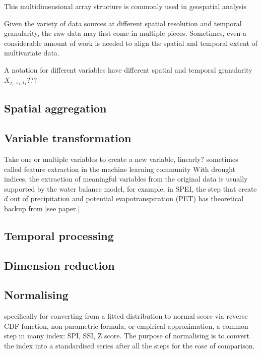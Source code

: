 \documentclass[
]{article}
\begin{document}
This multidimensional array structure is commonly used in geospatial
analysis

Given the variety of data sources at different spatial resolution and
temporal granularity, the raw data may first come in multiple pieces.
Sometimes, even a considerable amount of work is needed to align the
spatial and temporal extent of multivariate data.

A notation for different variables have different spatial and temporal
granularity \(X_{j_1, s_1, t_1}\)???

\hypertarget{spatial-aggregation}{%
\subsection{Spatial aggregation}\label{spatial-aggregation}}

\hypertarget{variable-transformation}{%
\subsection{Variable transformation}\label{variable-transformation}}

Take one or multiple variables to create a new variable, linearly?
sometimes called feature extraction in the machine learning community
With drought indices, the extraction of meaningful variables from the
original data is usually supported by the water balance model, for
example, in SPEI, the step that create \(d\) out of precipitation and
potential evapotranspiration (PET) has theoretical backup from {[}see
paper.{]}

\hypertarget{temporal-processing}{%
\subsection{Temporal processing}\label{temporal-processing}}

\hypertarget{dimension-reduction}{%
\subsection{Dimension reduction}\label{dimension-reduction}}

\hypertarget{normalising}{%
\subsection{Normalising}\label{normalising}}

specifically for converting from a fitted distribution to normal score
via reverse CDF function, non-parametric formula, or empirical
approximation, a common step in many index: SPI, SSI, Z score. The
purpose of normalising is to convert the index into a standardised
series after all the steps for the ease of comparison.
\end{document}
